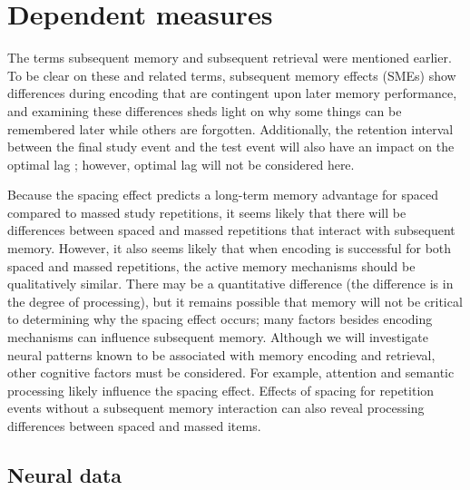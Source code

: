 
\chapter{Dependent measures}

\cbstart
The terms subsequent memory and subsequent retrieval were mentioned earlier.  To be clear on these and related terms, subsequent memory effects (SMEs) show differences during encoding that are contingent upon later memory performance, and examining these differences sheds light on why some things can be remembered later while others are forgotten.  Additionally, the retention interval between the final study event and the test event will also have an impact on the optimal lag \cite{CepeEtal2006,Glen1976,Glen1977,Glen1979}; however, optimal lag will not be considered here.
\cbend

Because the spacing effect predicts a long-term memory advantage for spaced compared to massed study repetitions, it seems likely that there will be differences between spaced and massed repetitions that interact with subsequent memory.  However, it also seems likely that when encoding is successful for both spaced and massed repetitions, the active memory mechanisms should be qualitatively similar.  There may be a quantitative difference (the difference is in the degree of processing), but it remains possible that memory will not be critical to determining why the spacing effect occurs; many factors besides encoding mechanisms can influence subsequent memory.  Although we will investigate neural patterns known to be associated with memory encoding and retrieval, other cognitive factors must be considered.  For example, attention and semantic processing likely influence the spacing effect.  Effects of spacing for repetition events without a subsequent memory interaction can also reveal processing differences between spaced and massed items.


\section{Neural data}

\cbstart


